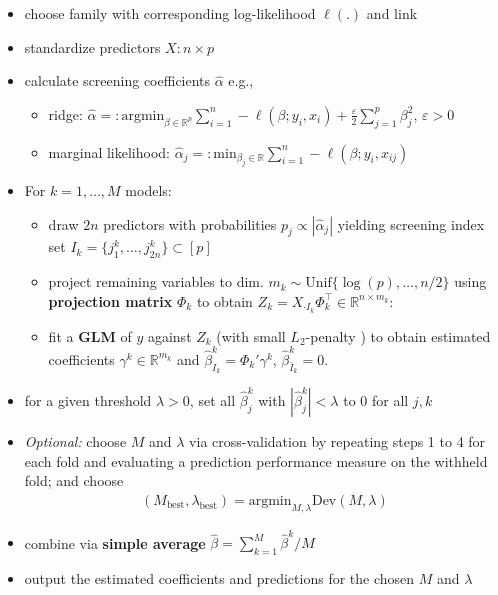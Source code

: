 \documentclass[
  article]{jss}
\providecommand{\tightlist}{%
  \setlength{\itemsep}{0pt}\setlength{\parskip}{0pt}}\usepackage{longtable,booktabs,array}
\begin{document}
\begin{itemize}
\item
  choose family with corresponding log-likelihood \(\ell(.)\) and link
\item
  standardize predictors \(X:n\times p\)
\item
  calculate screening coefficients \(\hat\alpha\) e.g.,

  \begin{itemize}
  \tightlist
  \item
    ridge:
    \(\hat\alpha=: \text{argmin}_{{\beta}\in\mathbb{R}^p}\sum_{i=1}^n -\ell(\beta;y_i,x_i) + \frac{\varepsilon}{2}\sum_{j=1}^p{\beta}_j^2, \, \varepsilon > 0\)
  \item
    marginal likelihood:
    \(\hat\alpha_j=: \text{min}_{{\beta_j}\in\mathbb{R}}\sum_{i=1}^n -\ell(\beta;y_i,x_{ij})\)
  \end{itemize}
\item
  For \(k=1,\dots,M\) models:

  \begin{itemize}
  \item
    draw \(2n\) predictors with probabilities
    \(p_j\propto |\hat\alpha_j|\) yielding screening index set
    \(I_k=\{j_1^k,\dots,j_{2n}^k\}\subset[p]\)
  \item
    project remaining variables to dim.
    \(m_k\sim \text{Unif}\{\log(p),\dots,n/2\}\) using
    \textbf{projection matrix} \(\Phi_k\) to obtain
    \(Z_k=X_{\cdot I_k}\Phi_k^\top \in \mathbb{R}^{n\times m_k}\):
  \item
    fit a \textbf{GLM} of \(y\) against \(Z_k\) (with small
    \(L_2\)-penalty \cite{glmnet2023}) to obtain estimated coefficients
    \(\gamma^k\in\mathbb{R}^{m_k}\) and
    \(\hat \beta_{I_k}^k=\Phi_k'\gamma^k\),
    \(\hat \beta_{\bar I_k}^k=0\).
  \end{itemize}
\item
  for a given threshold \(\lambda>0\), set all \(\hat\beta_j^k\) with
  \(|\hat\beta_j^k|<\lambda\) to \(0\) for all \(j,k\)
\item
  \textit{Optional:} choose \(M\) and \(\lambda\) via cross-validation
  by repeating steps 1 to 4 for each fold and evaluating a prediction
  performance measure on the withheld fold; and choose \begin{align}
       (M_{\text{best}},\lambda_{\text{best}}) = \text{argmin}_{M,\lambda}\text{Dev}(M,\lambda)
     \end{align}
\item
  combine via \textbf{simple average}
  \(\hat \beta = \sum_{k=1}^M\hat \beta^k / M\)
\item
  output the estimated coefficients and predictions for the chosen \(M\)
  and \(\lambda\)
\end{itemize}
\end{document}
